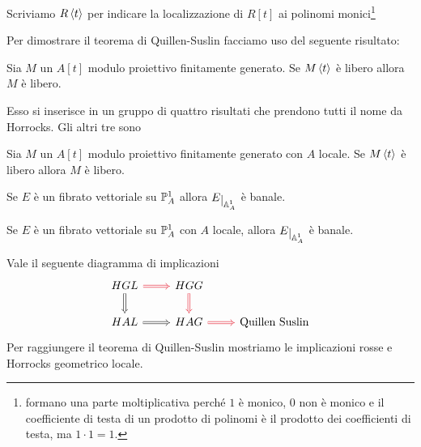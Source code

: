 \begin{notation}
Scriviamo $R\left\langle {t}\right\rangle$ per indicare la localizzazione di $R[t]$ ai polinomi monici\footnote{formano una parte moltiplicativa perch\'e $1$ \`e monico, $0$ non \`e monico e il coefficiente di testa di un prodotto di polinomi \`e il prodotto dei coefficienti di testa, ma $1\cdot 1=1$.}
\end{notation}

Per dimostrare il teorema di Quillen-Suslin facciamo uso del seguente risultato:

\begin{theorem}\label{ThHorrocksAlgebricoGlobale}
Sia $M$ un $A[t]$ modulo proiettivo finitamente generato. Se $M\left\langle {t}\right\rangle$ \`e libero allora $M$ \`e libero.
\end{theorem}

Esso si inserisce in un gruppo di quattro risultati che prendono tutti il nome da Horrocks. Gli altri tre sono

\begin{theorem}\label{ThHorrocksAlgebricoLocale}
Sia $M$ un $A[t]$ modulo proiettivo finitamente generato con $A$ locale. Se $M\left\langle {t}\right\rangle$ \`e libero allora $M$ \`e libero.
\end{theorem}



\begin{theorem}\label{ThHorrocksGeometricoGlobale}
Se $E$ \`e un fibrato vettoriale su $\mathbb{P}^1_A$ allora $E\res{\A^1_A}$ \`e banale.
\end{theorem}

\begin{theorem}\label{ThHorrocksGeometricoLocale}
Se $E$ \`e un fibrato vettoriale su $\mathbb{P}^1_A$ con $A$ locale, allora $E\res{\A^1_A}$ \`e banale.
\end{theorem}

\noindent Vale il seguente diagramma di implicazioni
\[\begin{tikzcd}
	HGL & HGG \\
	HAL & HAG & {\text{Quillen Suslin}}
	\arrow[color={rgb,255:red,224;green,0;blue,22}, Rightarrow, from=1-1, to=1-2]
	\arrow[Rightarrow, from=1-1, to=2-1]
	\arrow[color={rgb,255:red,224;green,0;blue,22}, Rightarrow, from=1-2, to=2-2]
	\arrow[Rightarrow, from=2-1, to=2-2]
	\arrow[color={rgb,255:red,224;green,0;blue,22}, Rightarrow, from=2-2, to=2-3]
\end{tikzcd}\]
Per raggiungere il teorema di Quillen-Suslin mostriamo le implicazioni rosse e Horrocks geometrico locale.


